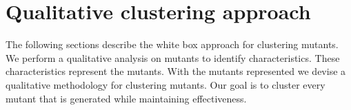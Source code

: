 \documentclass[../main]{subfiles}
\begin{document}
\chapter{Qualitative clustering approach}
\label{ch:reserach_question1}
The following sections describe the white box approach for clustering mutants.
We perform a qualitative analysis on mutants to identify characteristics. 
These characteristics represent the mutants.
With the mutants represented we devise a qualitative methodology for clustering mutants.
Our goal is to cluster every mutant that is generated while maintaining effectiveness.


\end{document}
